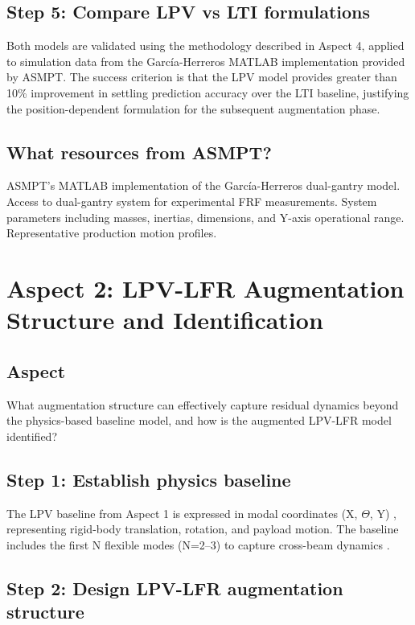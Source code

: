 \subsection{Step 5: Compare LPV vs LTI formulations}

Both models are validated using the methodology described in Aspect 4, applied to simulation data from the García-Herreros MATLAB implementation provided by ASMPT. The success criterion is that the LPV model provides greater than 10\% improvement in settling prediction accuracy over the LTI baseline, justifying the position-dependent formulation for the subsequent augmentation phase.

\subsection{What resources from ASMPT?}

ASMPT's MATLAB implementation of the García-Herreros dual-gantry model. Access to dual-gantry system for experimental FRF measurements. System parameters including masses, inertias, dimensions, and Y-axis operational range. Representative production motion profiles.

\section{Aspect 2: LPV-LFR Augmentation Structure and Identification}

\subsection*{Aspect}
What augmentation structure can effectively capture residual dynamics beyond the physics-based baseline model, and how is the augmented LPV-LFR model identified?

\subsection{Step 1: Establish physics baseline}

The LPV baseline from Aspect 1 is expressed in modal coordinates (X, $\Theta$, Y) \citep{garcia2013model}, representing rigid-body translation, rotation, and payload motion. The baseline includes the first N flexible modes (N=2--3) to capture cross-beam dynamics \citep{chen2019modeling}.

\subsection{Step 2: Design LPV-LFR augmentation structure}


